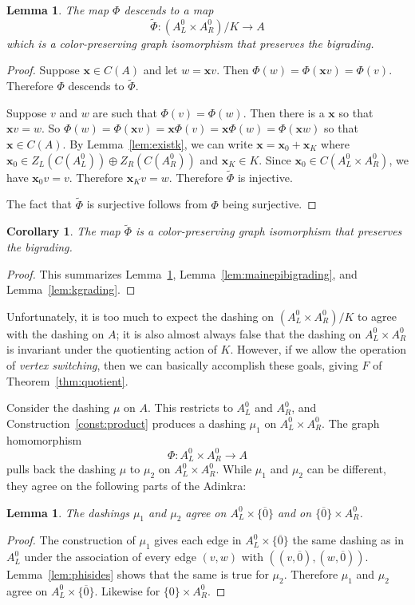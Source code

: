 \documentclass[12pt,twoside,singlespace]{article}
\numberwithin{equation}{section}
\newtheorem{lem}[equation]{Lemma}
\newtheorem{cor}[equation]{Corollary}
\theoremstyle{definition}
\renewcommand{\vec}[1]{\mathbf{#1}}
\begin{document}
\begin{lem}
\label{lem:isocolor}
The map $\Phi$ descends to a map
\[\tilde{\Phi}:(A_L^0\times A_R^0)/K\to A\]
which is a color-preserving graph isomorphism that preserves the bigrading.
\end{lem}
\begin{proof}
Suppose $\vec{x}\in C(A)$ and let $w=\vec{x}v$.  Then $\Phi(w)=\Phi(\vec{x}v)=\Phi(v)$.  Therefore $\Phi$ descends to $\tilde{\Phi}$.

Suppose $v$ and $w$ are such that $\Phi(v)=\Phi(w)$.  Then there is a $\vec{x}$ so that $\vec{x}v=w$.  So $\Phi(w)=\Phi(\vec{x}v)=\vec{x}\Phi(v)=\vec{x}\Phi(w)=\Phi(\vec{x}w)$ so that $\vec{x}\in C(A)$.  By Lemma~\ref{lem:existk}, we can write $\vec{x}=\vec{x}_0+\vec{x}_K$ where $\vec{x}_0\in Z_L(C(A_L^0))\oplus Z_R(C(A_R^0))$ and $\vec{x}_K\in K$.  Since $\vec{x}_0\in C(A_L^0\times A_R^0)$, we have $\vec{x}_0 v = v$.  Therefore $\vec{x}_K v= w$.  Therefore $\tilde{\Phi}$ is injective.

The fact that $\tilde{\Phi}$ is surjective follows from $\Phi$ being surjective.
\end{proof}

\begin{cor}
\label{cor:mainisocolorbigrading}
The map $\tilde{\Phi}$ is a color-preserving graph isomorphism that preserves the bigrading.
\end{cor}
\begin{proof}
This summarizes Lemma~\ref{lem:isocolor}, Lemma~\ref{lem:mainepibigrading}, and Lemma~\ref{lem:kgrading}.
\end{proof}



Unfortunately, it is too much to expect the dashing on $(A_L^0\times A_R^0)/K$ to agree with the dashing on $A$; it is also almost always false that the dashing on $A_L^0\times A_R^0$ is invariant under the quotienting action of $K$. However, if we allow the operation of \emph{vertex switching}, then we can basically accomplish these goals, giving $F$ of Theorem~\ref{thm:quotient}.

Consider the dashing $\mu$ on $A$.  This restricts to $A_L^0$ and $A_R^0$, and Construction~\ref{const:product} produces a dashing $\mu_1$ on $A_L^0\times A_R^0$.   The graph homomorphism
\[\Phi:A_L^0\times A_R^0\to A\]
pulls back the dashing $\mu$ to $\mu_2$ on $A_L^0\times A_R^0$. While $\mu_1$ and $\mu_2$ can be different, they agree on the following parts of the Adinkra:

\begin{lem}
\label{lem:agree-on-boundary}
The dashings $\mu_1$ and $\mu_2$ agree on $A_L^0\times \{\overline{0}\}$ and on $\{\overline{0}\}\times A_R^0$.
\end{lem}
\begin{proof}
The construction of $\mu_1$ gives each edge in $A_L^0\times\{\overline{0}\}$ the same dashing as in $A_L^0$ under the association of every edge $(v,w)$ with $((v,\overline{0}),(w,\overline{0}))$.  Lemma~\ref{lem:phisides} shows that the same is true for $\mu_2$.  Therefore $\mu_1$ and $\mu_2$ agree on $A_L^0\times\{\overline{0}\}$.  Likewise for $\{0\}\times A_R^0$.
\end{proof}
\end{document}
